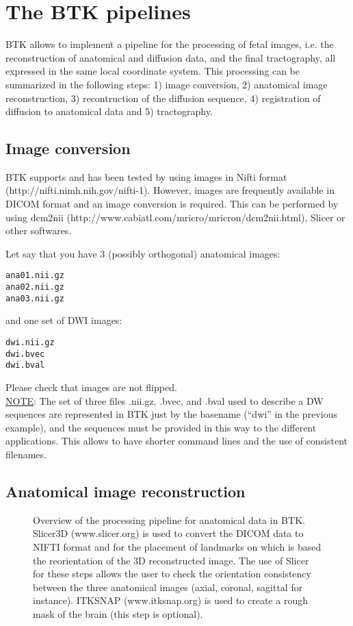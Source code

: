 \section{The BTK pipelines}
BTK allows to implement a pipeline for the processing of fetal images,
i.e. the reconstruction of anatomical and diffusion data, and the final
tractography, all expressed in the same local coordinate system. This
processing can be summarized in the following steps: 1) image conversion, 2) anatomical image reconstruction, 3)
recontruction of the diffusion sequence, 4) registration of diffusion to anatomical data and 5)
tractography.

\subsection{Image conversion}
BTK supports and has been tested by using images in Nifti format
(http://nifti.nimh.nih.gov/nifti-1). However, images are frequently available in
DICOM format and an image conversion is required. This can be performed by using
dcm2nii (http://www.cabiatl.com/mricro/mricron/dcm2nii.html), Slicer or other softwares.

Let say that you have 3 (possibly orthogonal) anatomical images:
\begin{verbatim}
ana01.nii.gz 
ana02.nii.gz 
ana03.nii.gz 
\end{verbatim}

and one set of DWI images: 
\begin{verbatim}
dwi.nii.gz
dwi.bvec 
dwi.bval 
\end{verbatim}

Please check that images are not flipped.\\

\underline{NOTE}: The set of three files .nii.gz, .bvec, and .bval used to
describe a DW sequences are represented in BTK just by the basename (``dwi'' in
the previous example), and the sequences must be provided in this way to the
different applications. This allows to have shorter command lines and the use
of consistent filenames.

\subsection{Anatomical image reconstruction}


  \begin{figure*}[!h]
   \caption{Overview of the processing pipeline for anatomical data in BTK. Slicer3D (www.slicer.org) is used to convert the DICOM data to NIFTI format and for the placement of landmarks on which is based the reorientation of the 3D reconstructed image. The use of Slicer for these steps allows the user to check the orientation consistency between the three anatomical images (axial, coronal, sagittal for instance). ITKSNAP (www.itksnap.org) is used to create a rough mask of the brain (this step is optional).}
   \label{fig:anatomical_pipeline}
 \end{figure*}

